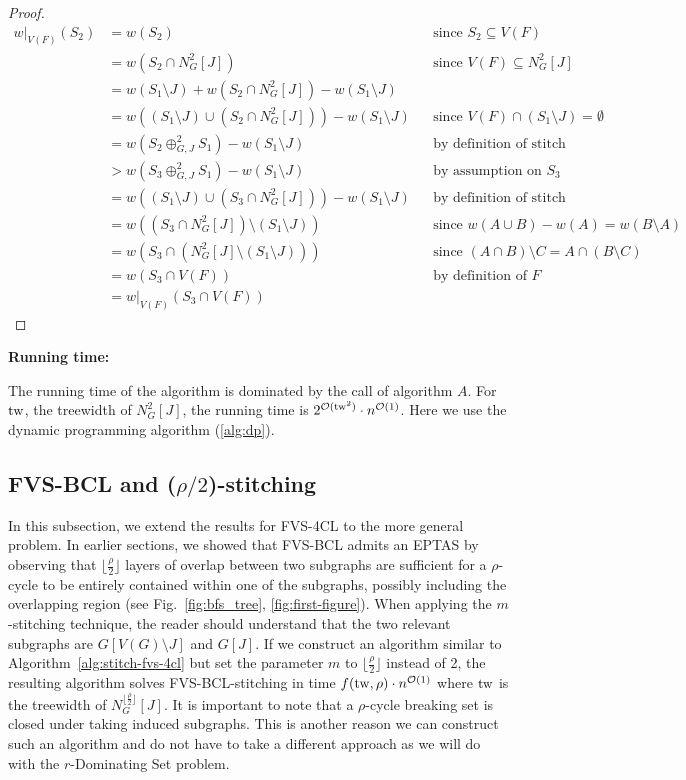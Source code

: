 \begin{proof}
\[
\begin{aligned}
w|_{V(F)}(S_2) &= w(S_2) && \text{since } S_2 \subseteq V(F) \text{} \\
&= w(S_2 \cap N^{2}_{G}[J]) && \text{since } V(F) \subseteq N^{2}_{G}[J] \\
&= w(S_1 \setminus J) + w(S_2 \cap N^{2}_{G}[J]) - w(S_1 \setminus J)  \\
&= w((S_1 \setminus J) \cup (S_2 \cap N^{2}_{G}[J])) - w(S_1 \setminus J) && \text{since } V(F) \cap (S_1 \setminus J) = \emptyset \\
&= w(S_2 \oplus^{2}_{G,J} S_1) - w(S_1 \setminus J) && \text{by definition of stitch} \\
&> w(S_3 \oplus^{2}_{G,J} S_1) - w(S_1 \setminus J) && \text{by assumption on } S_3 \\
&= w((S_1 \setminus J) \cup (S_3 \cap N^{2}_{G}[J])) - w(S_1 \setminus J) && \text{by definition of stitch} \\
&= w((S_3 \cap N^{2}_{G}[J]) \setminus (S_1 \setminus J)) && \text{since } w(A \cup B) - w(A) = w(B \setminus A)  \\
&= w(S_3 \cap (N^{2}_{G}[J] \setminus (S_1 \setminus J))) && \text{since } (A \cap B) \setminus C = A \cap (B \setminus C)  \\
&= w(S_3 \cap V(F)) && \text{by definition of } F \\
&= w|_{V(F)}(S_3 \cap V(F))
\end{aligned}
\]
\end{proof}

\textbf{Running time:}

The running time of the algorithm is dominated by the call of algorithm $A$. For 
$\operatorname{tw}$, the treewidth of $N^{2}_{G}[J]$, 
the running time is 
$2^{\mathcal{O}(\operatorname{tw}^2)} \cdot n^{\mathcal{O}(1)}$. Here we use the dynamic programming algorithm (\ref{alg:dp}).

\subsection{FVS-BCL and ($\rho / 2$)-stitching}

In this subsection, we extend the results for FVS-4CL to the more general problem. 
In earlier sections, we showed that FVS-BCL admits an EPTAS by observing that 
$\lfloor \frac{\rho}{2} \rfloor$ layers of overlap between two subgraphs are sufficient for a 
$\rho$-cycle to be entirely contained within one of the subgraphs, possibly including the 
overlapping region (see Fig.~\ref{fig:bfs_tree}, \ref{fig:first-figure}). 
When applying the $m$-stitching technique, the reader should understand that the two relevant 
subgraphs are $G[V(G) \setminus J]$ and $G[J]$. If we construct an algorithm similar to 
Algorithm~\ref{alg:stitch-fvs-4cl} but set the parameter $m$ to 
$\lfloor \frac{\rho}{2} \rfloor$ instead of 2, the resulting algorithm solves 
FVS-BCL-stitching in time 
$f(\operatorname{tw}, \rho) \cdot n^{\mathcal{O}(1)}$ 
where $\operatorname{tw}$ is the treewidth of $N^{\lfloor\frac{\rho}{2}\rfloor}_{G}[J]$. 
It is important to note that a $\rho$-cycle breaking set is closed under taking 
induced subgraphs. This is another reason we can construct such an algorithm and do not 
have to take a different approach as we will do with the $r$-Dominating Set problem.

